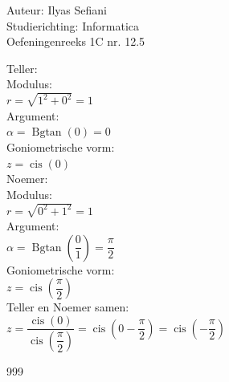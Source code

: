\documentclass[a4paper]{article}
\begin{document}
\noindent \large Auteur: Ilyas Sefiani \\
\noindent \large Studierichting: Informatica\\
\noindent \large Oefeningenreeks 1C nr. 12.5\\

\medskip

\normalsize 

Teller:\\

Modulus:\\

$r=\sqrt{1^2+0^2}=1$\\

Argument:\\

$\alpha = \operatorname{Bgtan}(0) = 0$\\

Goniometrische vorm:\\

$z=\operatorname{cis}(0)$\\

Noemer:\\

Modulus:\\

$r=\sqrt{0^2+1^2}=1$\\

Argument:\\

$\alpha = \operatorname{Bgtan}\left(\dfrac{0}{1}\right) = \dfrac{\pi}{2}$\\

Goniometrische vorm:\\

$z=\operatorname{cis}\left(\dfrac{\pi}{2}\right)$\\

Teller en Noemer samen:\\

$z=\dfrac{\operatorname{cis}(0)}{\operatorname{cis}\left(\dfrac{\pi}{2}\right)}=\operatorname{cis}\left(0-\dfrac{\pi}{2}\right)=\operatorname{cis}\left(-\dfrac{\pi}{2}\right)$\\

\begin{thebibliography}{999}
\end{thebibliography}
\end{document}
